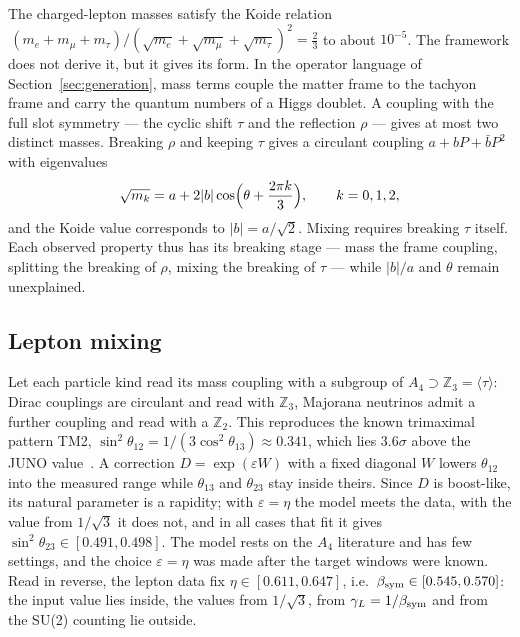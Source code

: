 The charged-lepton masses satisfy the Koide relation~\cite{koide}
\(\,(m_e+m_\mu+m_\tau)/(\sqrt{m_e}+\sqrt{m_\mu}+\sqrt{m_\tau})^2=\tfrac23\) to about \(10^{-5}\).  The framework does not derive it, but it gives its
form.  In the operator language of Section~\ref{sec:generation}, mass terms couple the matter frame to the tachyon frame and carry the
quantum numbers of a Higgs doublet.  A coupling with the full slot symmetry --- the cyclic shift \(\tau\) and the reflection \(\rho\) --- gives at
most two distinct masses.  Breaking \(\rho\) and keeping \(\tau\) gives a circulant coupling \(a+bP+\bar bP^2\) with eigenvalues
\begin{equation}\label{eq:brannen}
\sqrt{m_k}=a+2|b|\cos\Bigl(\theta+\frac{2\pi k}{3}\Bigr),\qquad k=0,1,2,
\end{equation}
and the Koide value corresponds to \(|b|=a/\sqrt2\).  Mixing requires breaking \(\tau\) itself.  Each observed property thus has its breaking
stage --- mass the frame coupling, splitting the breaking of \(\rho\), mixing the breaking of \(\tau\) --- while \(|b|/a\) and \(\theta\) remain
unexplained.

\subsection{Lepton mixing}

Let each particle kind read its mass coupling with a subgroup of \(A_4\supset\mathbb Z_3=\langle\tau\rangle\): Dirac couplings are circulant and
read with \(\mathbb Z_3\), Majorana neutrinos admit a further coupling and read with a \(\mathbb Z_2\).  This reproduces the known trimaximal pattern
TM2, \(\sin^2\theta_{12}=1/(3\cos^2\theta_{13})\approx0.341\), which lies \(3.6\sigma\) above the JUNO value~\cite{juno}.  A correction
\(D=\exp(\varepsilon W)\) with a fixed diagonal \(W\) lowers \(\theta_{12}\) into the measured range while \(\theta_{13}\) and \(\theta_{23}\) stay inside theirs.
Since \(D\) is boost-like, its natural parameter is a rapidity; with \(\varepsilon=\eta\) the model meets the data, with the value from
\(1/\sqrt3\) it does not, and in all cases that fit it gives \(\sin^2\theta_{23}\in[0.491,0.498]\).  The model rests on the \(A_4\) literature and has
few settings, and the choice \(\varepsilon=\eta\) was made after the target windows were known.  Read in reverse, the lepton data fix
\(\eta\in[0.611,0.647]\), i.e.\ \(\beta_{\rm sym}\in[0.545,0.570]\): the input value lies inside, the values from \(1/\sqrt3\), from \(\gamma_L=1/\beta_{\rm sym}\)
and from the SU(2) counting lie outside.

